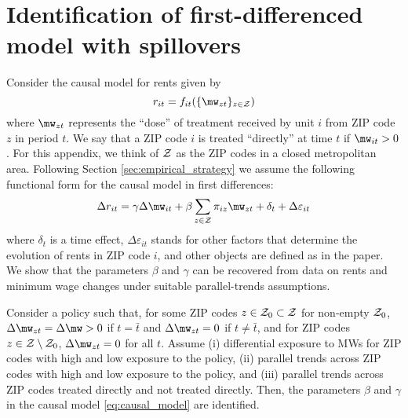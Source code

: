 \clearpage
\section{Identification of first-differenced model with spillovers}\label{sec:did_spillovers_id}

Consider the causal model for rents given by
$$r_{it}=f_{it}(\{\mw_{zt}\}_{z\in\Z})$$
where $\mw_{zt}$ represents the ``dose'' of treatment received by unit $i$ from
ZIP code $z$ in period $t$.
We say that a ZIP code $i$ is treated ``directly'' at time $t$ if $\mw_{it}>0$.
For this appendix, we think of $\mathcal{Z}$ as the ZIP codes in a closed metropolitan 
area. 
Following Section \ref{sec:empirical_strategy} we assume the following functional
form for the causal model in first differences:
\begin{equation}\label{eq:causal_model}
    \Delta r_{it} = \gamma \Delta \mw_{it} 
                  + \beta \sum_{z\in\Z} \pi_{iz} \mw_{zt}
                  + \delta_t + \Delta \varepsilon_{it}
\end{equation}
where $\delta_t$ is a time effect,
$\Delta \varepsilon_{it}$ stands for other factors that determine the evolution
of rents in ZIP code $i$, and
other objects are defined as in the paper.
We show that the parameters $\beta$ and $\gamma$ can be recovered from data on 
rents and minimum wage changes under suitable parallel-trends assumptions.

\begin{prop}[Identification]\label{prop:did_id}
    Consider a policy such that, 
    for some ZIP codes $z\in\mathcal{Z}_0\subset\mathcal{Z}$ for non-empty $\mathcal{Z}_0$,
        $\Delta\mw_{zt}=\Delta\mw>0$ if $t=\bar{t}$ and
        $\Delta\mw_{zt}=0$           if $t\neq\bar{t}$,
    and for ZIP codes $z\in\mathcal{Z}\setminus\mathcal{Z}_0$,
        $\Delta\mw_{zt}=0$ for all $t$.
    Assume
    (i) differential exposure to MWs for ZIP codes with high and low exposure to
    the policy,
    (ii) parallel trends across ZIP codes with high and low exposure to
    the policy, and
    (iii) parallel trends across ZIP codes treated directly and not treated 
    directly.
    Then, the parameters $\beta$ and $\gamma$ in the causal model \ref{eq:causal_model}
    are identified.
\end{prop}

